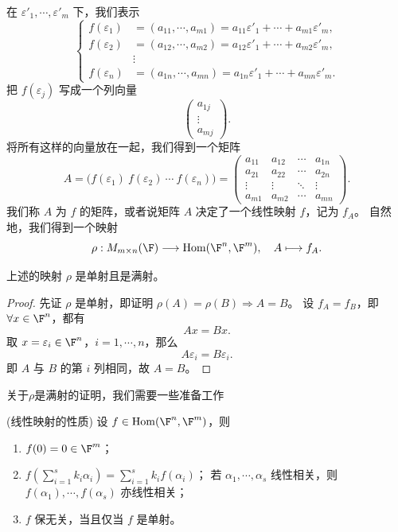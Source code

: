 在 $\varepsilon'_1,\cdots,\varepsilon'_m$ 下，我们表示
\[
\left\{
\begin{aligned}
	f(\varepsilon_1)&=(a_{11},\cdots,a_{m1})
	=a_{11}\varepsilon'_1+\cdots+a_{m1}\varepsilon'_m,\\
	f(\varepsilon_2)&=(a_{12},\cdots,a_{m2})
	=a_{12}\varepsilon'_1+\cdots+a_{m2}\varepsilon'_m,\\
	&\vdots\\
	f(\varepsilon_n)&=(a_{1n},\cdots,a_{mn})
	=a_{1n}\varepsilon'_1+\cdots+a_{mn}\varepsilon'_m.
\end{aligned}
\right.
\]
把 $f(\varepsilon_j)$ 写成一个列向量
\[
\begin{pmatrix}a_{1j}\\\vdots\\a_{mj}\end{pmatrix}.
\]
将所有这样的向量放在一起，我们得到一个矩阵
\[
A=\bigl(f(\varepsilon_1)\ f(\varepsilon_2)\ \cdots\ f(\varepsilon_n)\bigr)
=\begin{pmatrix}
	a_{11}&a_{12}&\cdots&a_{1n}\\
	a_{21}&a_{22}&\cdots&a_{2n}\\
	\vdots&\vdots&\ddots&\vdots\\
	a_{m1}&a_{m2}&\cdots&a_{mn}
\end{pmatrix}.
\]
\label{p1:concept:c3-l77}我们称 $A$ 为 $f$ 的矩阵，或者说矩阵 $A$ 决定了一个线性映射 $f$，记为 $f_A$。
自然地，我们得到一个映射
\[
\rho:M_{m\times n}(\F)\longrightarrow \operatorname{Hom}(\F^n,\F^m),
\quad A\longmapsto f_A.
\]
\begin{proposition}
	上述的映射 $\rho$ 是单射且是满射。
\end{proposition}
\begin{proof}
	先证 $\rho$ 是单射，即证明 $\rho(A)=\rho(B)\Rightarrow A=B$。
	设 $f_A=f_B$，即 $\forall x\in\F^n$，都有
	\[
	Ax=Bx.
	\]
	取 $x=\varepsilon_i\in\F^n$，$i=1,\cdots,n$，那么
	\[
	A\varepsilon_i=B\varepsilon_i.
	\]
	即 $A$ 与 $B$ 的第 $i$ 列相同，故 $A=B$。
\end{proof}
关于$\rho$是满射的证明，我们需要一些准备工作
\begin{proposition}(线性映射的性质)
	设 $f\in\operatorname{Hom}(\F^n,\F^m)$，则
	\begin{enumerate}
		\item $f(0)=0\in\F^m$；
		\item $f\left(\sum_{i=1}^{s}k_i\alpha_i\right)=\sum_{i=1}^{s}k_i f(\alpha_i)$；
		若 $\alpha_1,\cdots,\alpha_s$ 线性相关，则 $f(\alpha_1),\cdots,f(\alpha_s)$ 亦线性相关；
		\item $f$ 保无关，当且仅当 $f$ 是单射。
	\end{enumerate}
\end{proposition}
